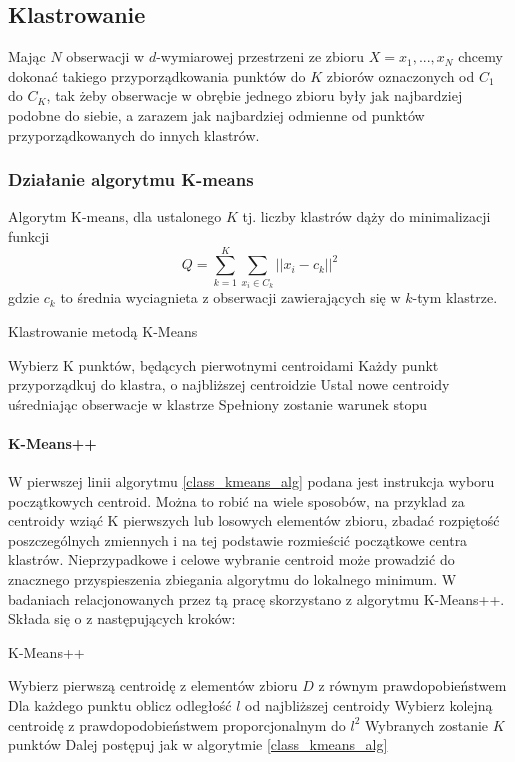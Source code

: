 \documentclass{article}
\begin{document}
\subsection{Klastrowanie}
Mając \(N\) obserwacji w \(d\)-wymiarowej przestrzeni ze zbioru \(X = {x_1, ..., x_N}\) chcemy dokonać takiego przyporządkowania punktów do \(K\) zbiorów oznaczonych od \(C_1\) do \(C_K\), tak żeby obserwacje w obrębie jednego zbioru były jak najbardziej podobne do siebie, a zarazem jak najbardziej odmienne od punktów przyporządkowanych do innych klastrów.\
\subsubsection{Działanie algorytmu K-means}
Algorytm K-means, dla ustalonego \(K\) tj. liczby klastrów dąży do minimalizacji funkcji 
\[Q = \sum\limits^K_{k=1}\sum\limits_{x_i \in C_k} ||x_i - c_k||^2\]
gdzie \(c_k\) to średnia wyciagnieta z obserwacji zawierających się w \(k\)-tym klastrze.

\begin{algorithm}
\label{class_kmeans_alg}
\caption{Klastrowanie metodą K-Means}
\begin{algorithmic}[1]
\STATE Wybierz K punktów, będących pierwotnymi centroidami
\REPEAT
\STATE Każdy punkt przyporządkuj do klastra, o najbliższej centroidzie
\STATE Ustal nowe centroidy uśredniając obserwacje w klastrze
\UNTIL Spełniony zostanie warunek stopu
\end{algorithmic}
\end{algorithm}	

\paragraph{K-Means++}
W pierwszej linii algorytmu \ref{class_kmeans_alg} podana jest instrukcja wyboru początkowych centroid. 
Można to robić na wiele sposobów, na przyklad za centroidy wziąć K pierwszych lub losowych elementów zbioru, zbadać rozpiętość poszczególnych zmiennych i na tej podstawie rozmieścić początkowe centra klastrów.
Nieprzypadkowe i celowe wybranie centroid może prowadzić do znacznego przyspieszenia zbiegania algorytmu do lokalnego minimum.
W badaniach relacjonowanych przez tą pracę skorzystano z algorytmu K-Means++\cite{C.K.Reddy2014}.
Składa się o z następujących kroków:
\begin{algorithm}
\label{k_means++}
\caption{K-Means++}
\begin{algorithmic}[1]
\STATE Wybierz pierwszą centroidę z elementów zbioru \(D\) z równym prawdopobieństwem
\REPEAT
\STATE Dla każdego punktu oblicz odległość \(l\) od najbliższej centroidy
\STATE Wybierz kolejną centroidę z prawdopodobieństwem proporcjonalnym do \(l^2\)
\UNTIL Wybranych zostanie \(K\) punktów
\STATE Dalej postępuj jak w algorytmie \ref{class_kmeans_alg}
\end{algorithmic}
\end{algorithm}
\end{document}
